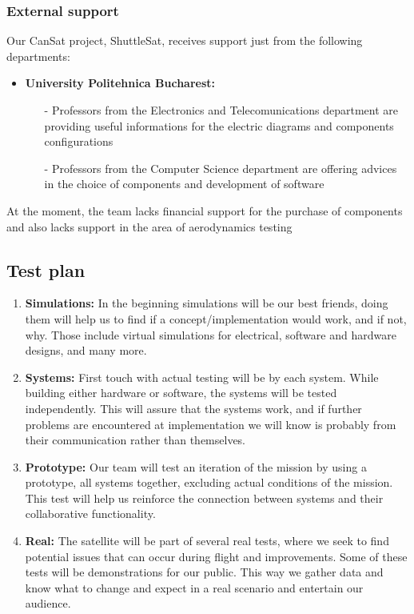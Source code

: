 \documentclass[11pt]{article}
\begin{document}
\subsubsection{External support}
Our CanSat project, ShuttleSat, receives support just from the following departments:
\begin{itemize}
\item \textbf{University Politehnica Bucharest:} 
\begin{itemize}
\item[-] Professors from the Electronics and Telecomunications department are providing useful informations for the electric diagrams and components configurations
\item[-] Professors from the Computer Science department are offering advices in the choice of components and development of software
\end{itemize}
\end{itemize}

At the moment, the team lacks financial support for the purchase of components and also lacks support in the area of aerodynamics testing

\subsection{Test plan}
\begin{enumerate}
    \item\textbf{Simulations:} {In the beginning simulations will be our best friends, doing them will help us to find if a concept/implementation would work, and if not, why. Those include virtual simulations for electrical, software and hardware designs, and many more.}
    \item\textbf{Systems:} {First touch with actual testing will be by each system. While building either hardware or software, the systems will be tested independently. This will assure that the systems work, and if further problems are encountered at implementation we will know is probably from their communication rather than themselves.}
    \item\textbf{Prototype:} {Our team will test an iteration of the mission by using a prototype, all systems together, excluding actual conditions of the mission. This test will help us reinforce the connection between systems and their collaborative functionality.}
    \item\textbf{Real:} {The satellite will be part of several real tests, where we seek to find potential issues that can occur during flight and improvements. Some of these tests will be demonstrations for our public. This way we gather data and know what to change and expect in a real scenario and entertain our audience.}
\end{enumerate}
\end{document}
